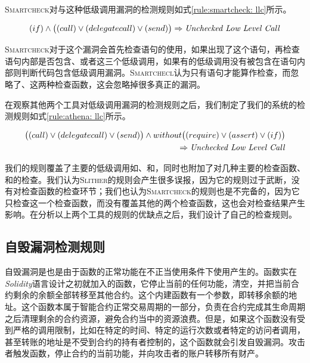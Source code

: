 \textsc{Smartcheck}对与这种低级调用漏洞的检测规则如式\ref{rule:smartcheck: llc}所示。
\begin{mdframed}[
	linewidth = 1pt,
	innertopmargin = -5pt,
	innerbottommargin = 3pt,
	outerlinewidth = 1pt
	]
    \small
	\begin{equation} \label{rule:smartcheck: llc}
    (if) \wedge \big ((call) \vee (delegatecall) \vee (send) \big ) \Rightarrow \text{\emph{Unchecked Low Level Call}}
	\end{equation}
\end{mdframed}
\textsc{Smartcheck}对于这个漏洞会首先检查语句的使用，如果出现了这个语句，再检查语句内部是否包含、或者这三个低级调用，如果有的低级调用没有被包含在语句内部则判断代码包含低级调用漏洞。\textsc{Smartchecl}认为只有语句才能算作检查，而忽略了、这两种检查函数，这会忽略掉很多真正的漏洞。

在观察其他两个工具对低级调用漏洞的检测规则之后，我们制定了我们的系统的检测规则如式\ref{rule:athena: llc}所示。
\begin{mdframed}[
	linewidth = 1pt,
	innertopmargin = -5pt,
	innerbottommargin = 3pt,
	outerlinewidth = 1pt
	]
    \small
	\begin{equation} \label{rule:athena: llc}
    \begin{split}
       \big ((call) \vee (delegatecall) \vee (send)\big ) \wedge without \big ((require) \vee (assert) \vee (if)\big )  \\
        \Rightarrow \text{\emph{Unchecked Low Level Call}}
    \end{split}
	\end{equation}
\end{mdframed}
我们的规则覆盖了主要的低级调用如、和，同时也附加了对几种主要的检查函数、和的检查。我们认为\textsc{Slither}的规则会产生很多误报，因为它的规则过于武断，没有对检查函数的检查环节；我们也认为\textsc{Smartcheck}的规则也是不完备的，因为它只检查这一个检查函数，而没有覆盖其他的两个检查函数，这也会对检查结果产生影响。在分析以上两个工具的规则的优缺点之后，我们设计了自己的检查规则。

\subsection{自毁漏洞检测规则}
自毁漏洞是也是由于函数的正常功能在不正当使用条件下使用产生的。函数实在\emph{Solidity}语言设计之初就加入的函数，它停止当前的任何功能，清空，并把当前合约剩余的余额全部转移至其他合约。这个内建函数有一个参数，即转移余额的地址。这个函数本属于智能合约正常交易周期的一部分，负责在合约完成其生命周期之后清理剩余的合约资源，避免合约当中的资源浪费。但是，如果这个函数没有受到严格的调用限制，比如在特定的时间、特定的运行次数或者特定的访问者调用，甚至转账的地址是不受到合约的持有者控制的，这个函数就会引发自毁漏洞。攻击者触发函数，停止合约的当前功能，并向攻击者的账户转移所有财产。

